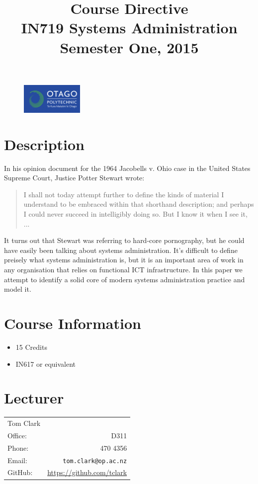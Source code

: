 \documentclass{article}
\begin{document}
\begin{figure}
\includegraphics[width=30mm]{../../../resources/images/oplogo.png}
\end{figure}

\title{Course Directive\\IN719 Systems Administration \\Semester One, 2015}
\date{}
\maketitle

\section*{Description}
In his opinion document for the 1964 Jacobells v. Ohio case in the United States Supreme Court, Justice Potter Stewart wrote:
\begin{quote}
I shall not today attempt further to define the kinds of material I understand to be embraced within that shorthand description; and perhaps I could never succeed in intelligibly doing so. But I know it when I see it, ...
\end{quote}
It turns out that Stewart was referring to hard-core pornography, but he could have easily been talking about systems administration. It's difficult to define preisely what systems administration is, but it is an important area of work in any organisation that relies on functional ICT infrastructure. In this paper we attempt to identify a solid core of modern systems administration practice and model it.



\section*{Course Information}
\begin{itemize}
  \item 15 Credits
  \item IN617 or equivalent
\end{itemize}

\section*{Lecturer}
\begin{tabular}{lr}

  Tom Clark &    \\
     Office: & D311 \\
     Phone: & 470 4356 \\
     Email: & \texttt{tom.clark@op.ac.nz} \\
     GitHub: & \url{https://github.com/tclark} 
\end{tabular}
\end{document}
